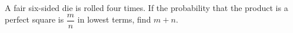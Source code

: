 A fair six-sided die is rolled four times. If the probability that the product is a perfect square is $\dfrac{m}{n}$ in lowest terms, find $m+n$.
